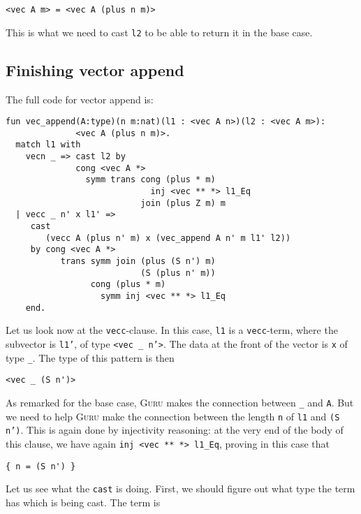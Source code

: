 \documentclass{book}[12pt]
\newcommand{\guru}[0]{\textsc{Guru}\xspace}
\begin{document}
\begin{verbatim}
<vec A m> = <vec A (plus n m)>
\end{verbatim}

\noindent This is what we need to cast \texttt{l2} to be able to
return it in the base case.

\subsection{Finishing vector append}
\label{ch7:vec_append}

The full code for vector append is:

\begin{verbatim}
fun vec_append(A:type)(n m:nat)(l1 : <vec A n>)(l2 : <vec A m>):
              <vec A (plus n m)>.
  match l1 with
    vecn _ => cast l2 by
              cong <vec A *>
                symm trans cong (plus * m)
                             inj <vec ** *> l1_Eq
                           join (plus Z m) m
  | vecc _ n' x l1' => 
     cast
        (vecc A (plus n' m) x (vec_append A n' m l1' l2)) 
     by cong <vec A *>
           trans symm join (plus (S n') m)
                           (S (plus n' m))
                 cong (plus * m)
                   symm inj <vec ** *> l1_Eq
    end.
\end{verbatim}

\noindent Let us look now at the \texttt{vecc}-clause.  In this case,
\texttt{l1} is a \texttt{vecc}-term, where the subvector is
\texttt{l1'}, of type \texttt{<vec \_ n'>}.  The data at the front of
the vector is \texttt{x} of type \texttt{\_}.  The type of this pattern
is then

\begin{verbatim}
<vec _ (S n')>
\end{verbatim}

\noindent As remarked for the base case, \guru makes the connection
between \texttt{\_} and \texttt{A}.  But we need to help \guru make
the connection between the length \texttt{n} of \texttt{l1} and
\texttt{(S n')}.  This is again done by injectivity reasoning: at
the very end of the body of this clause, we have again \texttt{inj <vec ** *> l1\_Eq},
proving in this case that

\begin{verbatim}
{ n = (S n') }
\end{verbatim}

\noindent Let us see what the \texttt{cast} is doing.  First, we
should figure out what type the term has which is being cast.  The term is
\end{document}
